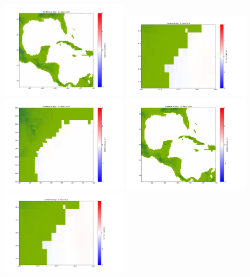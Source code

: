 \documentclass[11pt]{article}
\begin{document}
\vskip 10pt 
\includegraphics[width=0.475\textwidth]{frame0031fig1003.png}
\vskip 10pt 
\includegraphics[width=0.475\textwidth]{frame0032fig1001.png}
\includegraphics[width=0.475\textwidth]{frame0032fig1002.png}
\vskip 10pt 
\includegraphics[width=0.475\textwidth]{frame0032fig1003.png}
\vskip 10pt 
\includegraphics[width=0.475\textwidth]{frame0033fig1001.png}
\end{document}
